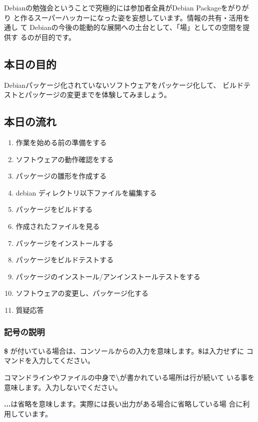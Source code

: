 \documentclass[mingoth,a4paper]{jsarticle}
\begin{document}
 Debianの勉強会ということで究極的には参加者全員がDebian Packageをがりがり
 と作るスーパーハッカーになった姿を妄想しています。情報の共有・活用を通し
 て Debianの今後の能動的な展開への土台として、「場」としての空間を提供す
 るのが目的です。

\subsection{本日の目的}

Debianパッケージ化されていないソフトウェアをパッケージ化して、
ビルドテストとパッケージの変更までを体験してみましょう。

\subsection{本日の流れ}
\begin{enumerate}
\item 作業を始める前の準備をする
\item ソフトウェアの動作確認をする
\item パッケージの雛形を作成する
\item debian ディレクトリ以下ファイルを編集する
\item パッケージをビルドする
\item 作成されたファイルを見る
\item パッケージをインストールする
\item パッケージをビルドテストする
\item パッケージのインストール/アンインストールテストをする
\item ソフトウェアの変更し、パッケージ化する
\item 質疑応答
\end{enumerate}

\subsubsection{記号の説明}
{\bf \$} が付いている場合は、コンソールからの入力を意味します。{\bf \$}は入力せずに
コマンドを入力してください。

コマンドラインやファイルの中身で{\bf \textbackslash}が書かれている場所は行が続いて
いる事を意味します。入力しないでください。 

{\bf ...}は省略を意味します。実際には長い出力がある場合に省略している場
合に利用しています。
\end{document}
